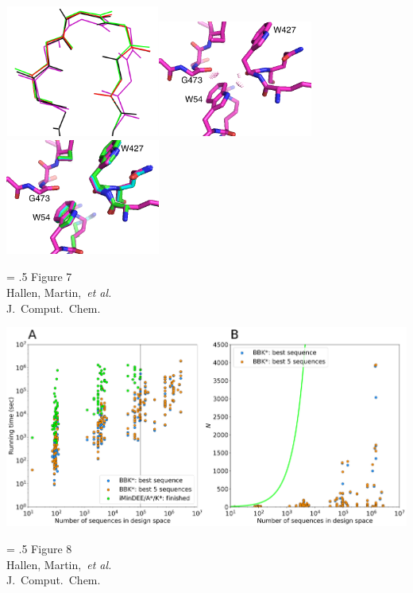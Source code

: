 \begin{center}
\includegraphics[width=2in,height=1.7in]{figures/cats_confs.png}\hspace{0.2in}\includegraphics[width=2in,height=1.5in]{figures/w54_rigidBB_clashes.png}\hspace{0.2in}\includegraphics[width=2in,height=1.5in]{figures/w54_overlay.png}
\end{center}
\vspace{0.25in}
\hspace*{3in}
{\Large
\begin{minipage}[t]{3in}
\baselineskip = .5\baselineskip
Figure 7 \\
Hallen, Martin,~\textit{et al.}\\
J.\ Comput.\ Chem.
\end{minipage}
}

\begin{center}
\includegraphics[width=6.5in]{figures/bbks.png}
\end{center}
\vspace{0.25in}
\hspace*{3in}
{\Large
\begin{minipage}[t]{3in}
\baselineskip = .5\baselineskip
Figure 8 \\
Hallen, Martin,~\textit{et al.}\\
J.\ Comput.\ Chem.
\end{minipage}
}

